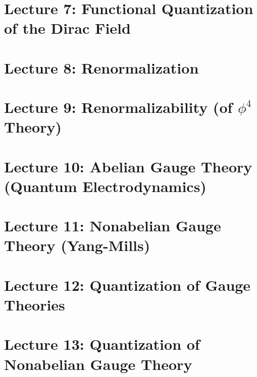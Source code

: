 \documentclass[10pt]{article}
\begin{document}
\section*{Lecture 7: Functional Quantization of the Dirac Field}
\label{sec: lec7}



\clearpage

\section*{Lecture 8: Renormalization}
\label{sec: lec8}



\clearpage

\section*{Lecture 9: Renormalizability (of $\phi^4$ Theory)}
\label{sec: lec9}



\clearpage

\section*{Lecture 10: Abelian Gauge Theory (Quantum Electrodynamics)}
\label{sec: lec10}



\clearpage

\section*{Lecture 11: Nonabelian Gauge Theory (Yang-Mills)}
\label{sec: lec11}



\clearpage

\section*{Lecture 12: Quantization of Gauge Theories}
\label{sec: lec12}



\clearpage

\section*{Lecture 13: Quantization of Nonabelian Gauge Theory}
\label{sec: lec13}
\end{document}
